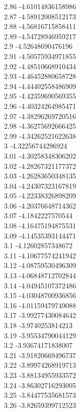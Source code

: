 {2.86	-4.61014836158986\\
2.87	-4.58912008512173\\
2.88	-4.56816715858411\\
2.89	-4.54728946959217\\
2.9	-4.52648690476196\\
2.91	-4.50575934971855\\
2.92	-4.48510668910434\\
2.93	-4.46452880658728\\
2.94	-4.44402558486909\\
2.95	-4.42359690569355\\
2.96	-4.40324264985471\\
2.97	-4.38296269720516\\
2.98	-4.36275692666425\\
2.99	-4.34262521622638\\
3	-4.32256744296924\\
3.01	-4.30258348306202\\
3.02	-4.28267321177372\\
3.03	-4.26283650348135\\
3.04	-4.24307323167819\\
3.05	-4.22338326898209\\
3.06	-4.20376648714362\\
3.07	-4.1842227570544\\
3.08	-4.16475194875531\\
3.09	-4.14535393144471\\
3.1	-4.12602857348672\\
3.11	-4.10677574241942\\
3.12	-4.08759530496309\\
3.13	-4.06848712702844\\
3.14	-4.04945107372486\\
3.15	-4.03048700936856\\
3.16	-4.01159479749088\\
3.17	-3.99277430084642\\
3.18	-3.9740253814213\\
3.19	-3.95534790044129\\
3.2	-3.93674171838007\\
3.21	-3.91820669496737\\
3.22	-3.89974268919713\\
3.23	-3.88134955933572\\
3.24	-3.86302716293005\\
3.25	-3.84477535681573\\
3.26	-3.82659399712523\\
}
